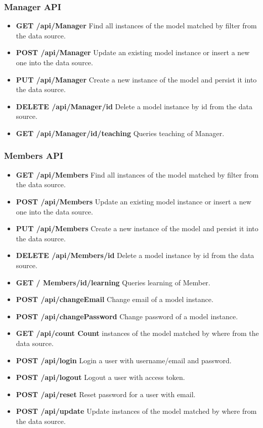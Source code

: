 \subsubsection{ Manager API}
\begin{itemize}
  \item \textbf{GET /api/Manager} Find all instances of the model matched by filter from the data source.
  \item \textbf{POST /api/Manager} Update an existing model instance or insert a new one into the data  source.
  \item \textbf{PUT /api/Manager} Create a new instance of the model and persist it into the data source.
  \item \textbf{DELETE /api/Manager/id} Delete a model instance by id from the data source.
\item \textbf{GET /api/Manager/id/teaching} Queries teaching of Manager.

\end{itemize}


\subsubsection{ Members API}
\begin{itemize}
\item \textbf{GET /api/Members} Find all instances of the model matched by filter from  the  data source.
\item \textbf{POST /api/Members} Update an existing model instance or insert a new one into the data  source.
\item \textbf{PUT /api/Members} Create a new instance of the model and persist it into the data source.
\item \textbf{DELETE /api/Members/id} Delete a model instance by id from the data source.
\item \textbf{GET / Members/id/learning} Queries learning of Member.

\item \textbf{POST /api/changeEmail} Change email of a model instance.
\item \textbf{POST /api/changePassword} Change password of a model instance.
\item \textbf{GET /api/count Count} instances of the model matched by where from the  data source.
\item \textbf{POST /api/login} Login a user with username/email and password.
\item \textbf{POST /api/logout} Logout a user with access   token.
\item \textbf{POST /api/reset} Reset password for a user with email.
\item \textbf{POST /api/update} Update instances of the model matched by where from the data source.
\end{itemize}


